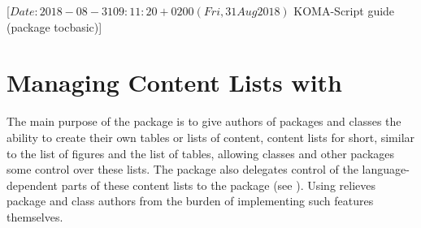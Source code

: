 %
%
%
%
%
%
%
%
% 
%
%
%
%

                 [$Date: 2018-08-31 09:11:20 +0200 (Fri, 31 Aug 2018) $
                  KOMA-Script guide (package tocbasic)]



\chapter{Managing Content Lists with }
\BeginIndexGroup%
%
%
%
%
The main purpose of the  package is to give authors of
packages and classes the ability to create their own tables or lists of
content, content lists for short, similar to the list of figures and the list
of tables, allowing classes and other packages some control over these lists.
The  package also delegates control of the
language-dependent parts of these content lists to the
 package (see \cite{package:babel}). Using
 relieves package and class authors from the burden of
implementing such features themselves.

